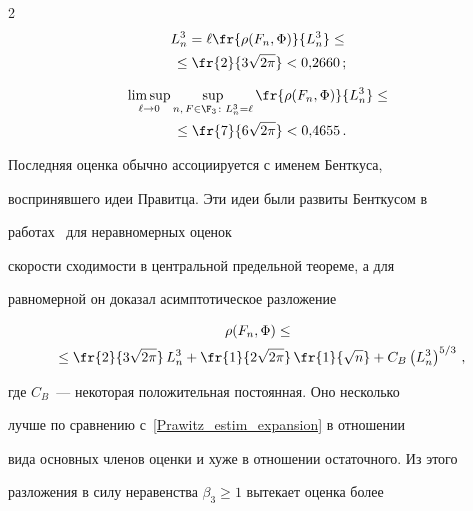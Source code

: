 \begin{multicols}{2}
\begin{multline*}
{L_n^3=\ell} \fr{\rho(F_n,\Phi)}{L_n^3}\le{}\\


{}\le \fr{2}{3\sqrt{2\pi}}<0{,}2660\,;


\end{multline*}





\vspace*{-12pt}





\noindent


\begin{multline*}


\limsup_{\ell\to0}\sup_{n,\,F\in\F_3\colon L_n^3=\ell}


\fr{\rho(F_n,\Phi)}{L_n^3} \le{}\\


{}\le \fr{7}{6\sqrt{2\pi}}<0{,}4655\,.


\end{multline*}





Последняя оценка обычно ассоциируется с именем Бенткуса,


воспринявшего идеи Правитца. Эти идеи были развиты Бенткусом в


работах~\cite{Bentkus1991, Bentkus1994} для неравномерных оценок


скорости сходимости в центральной предельной теореме, а для


равномерной он доказал асимптотическое разложение


\begin{multline}


\label{Bentkusexp}


\rho(F_n,\Phi)\le{}\\


{}\le \fr{2}{3\sqrt{2\pi}}\, L_n^3 +


\fr{1}{2\sqrt{2\pi}}\,\fr{1}{\sqrt{n}} + C_B\left(L_n^3\right)^{5/3}\,,


\end{multline}


где $C_B$~--- некоторая положительная постоянная. Оно несколько


лучше по сравнению с~\eqref{Prawitz_estim_expansion} в отношении


вида основных членов оценки и хуже в отношении остаточного. Из этого


разложения в силу неравенства $\beta_3\ge1$ вытекает оценка более



\end{multicols}
